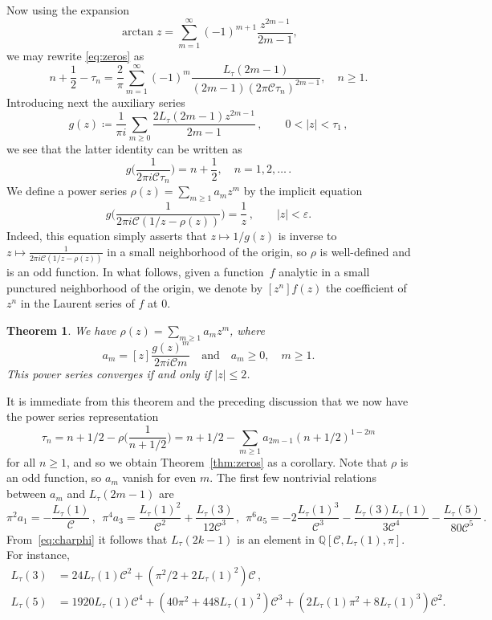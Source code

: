 \documentclass[12pt]{amsart}
\theoremstyle{plain}
\newtheorem{theorem}{Theorem}[section]
\numberwithin{equation}{section}
\theoremstyle{definition}
\newcommand{\Q}{\mathbb{Q}}
\newcommand{\Cone}{\mathscr{C}}
\begin{document}
Now using the expansion
\[ \arctan z = \sum_{m=1}^\infty (-1)^{m+1} \frac{z^{2m-1}}{2m-1}, \]
we may rewrite \eqref{eq:zeros} as
\[ n+\frac12-\tau_n = \frac{2}{\pi} \sum_{m=1}^\infty
(-1)^{m}  \frac{L_\tau(2m-1)}{(2m-1)(2\pi \Cone \tau_n)^{2m-1}}, \quad n\ge 1. \]
Introducing next the auxiliary series
	\[g(z)\coloneqq \frac{1}{\pi i} \sum_{m\ge0}\frac{2L_{\tau}(2m-1)z^{2m-1}}{2m-1}\,,\qquad 0<|z|<\tau_1\, ,\]
we see that the latter identity can be written as
	\[g\Big(\frac{1}{2\pi i \Cone \tau_n}\Big) = n+\frac12, \quad n = 1, 2, \ldots\, .\]
We define a power series $\rho(z)=\sum_{m\ge1}a_mz^m$ by the implicit equation
	\begin{equation}
	g\Big(\frac{1}{2\pi i \Cone (1/z-\rho(z))}\Big) = \frac{1}{z}\,,\qquad |z|<\varepsilon.
 	\end{equation}
Indeed, this equation simply asserts that $z\mapsto1/g(z)$ is inverse to $z\mapsto \frac{1}{2\pi i \Cone (1/z-\rho(z))}$ in a small neighborhood of the origin, so $\rho$ is well-defined and is an odd function. In what follows, given a function~$f$ analytic in a small punctured neighborhood of the origin, we denote by $[z^n]f(z)$ the coefficient of $z^n$ in the Laurent series of $f$ at $0$. 
\begin{theorem}\label{thm:zeroexp}
	We have $\rho(z)=\sum_{m\ge1}a_mz^m$, where
	\[a_m = [z]\frac{g(z)^m}{2\pi i \Cone m}\quad \text{and} \quad a_m\ge 0,  \quad m\ge1.\]
	This power series converges if and only if $|z|\le 2$. \end{theorem}
It is immediate from this theorem and the preceding discussion that
we now have the power series representation
	\begin{equation*}\label{eq:analyticzeros}
	\tau_n = n+1/2-\rho\Big(\frac{1}{n+1/2}\Big) = n+1/2-\sum_{m\ge1}a_{2m-1}(n+1/2)^{1-2m}
	\end{equation*}
	for all $n\ge1$, and so we obtain Theorem~\ref{thm:zeros} as a corollary. 
Note that $\rho$ is an odd function, so $a_m$ vanish for even $m$. The first few nontrivial relations between $a_m$ and $L_{\tau}(2m-1)$ are
	\begin{equation} \label{eq:a1q} \pi^2a_1 = -\frac{L_{\tau}(1)}{\Cone}\,,\ \
	  \pi^4a_3 = \frac{L_{\tau}(1)^2}{\Cone^2}+\frac{L_{\tau}(3)}{12\Cone^3}\,,\ \
	  \pi^6a_5 = -2\frac{L_{\tau}(1)^3}{\Cone^3}-\frac{L_{\tau}(3)L_{\tau}(1)}{3\Cone^4}-\frac{L_{\tau}(5)}{80\Cone^5}\,.\end{equation} 
From~\eqref{eq:charphi} it follows that $L_{\tau}(2k-1)$ is an element in $\Q[\Cone,L_{\tau}(1),\pi]$. For instance,
	\begin{align*}
	L_{\tau}(3) &= 24L_{\tau}(1)\Cone^2 + (\pi^2/2+2L_{\tau}(1)^2)\Cone\,,\\
	L_{\tau}(5) &= 1920L_{\tau}(1)\Cone^4 + (40\pi^2 + 448L_{\tau}(1)^2)\Cone^3 + (2L_{\tau}(1)\pi^2 + 8L_{\tau}(1)^3)\Cone^2.
	\end{align*}
\end{document}
